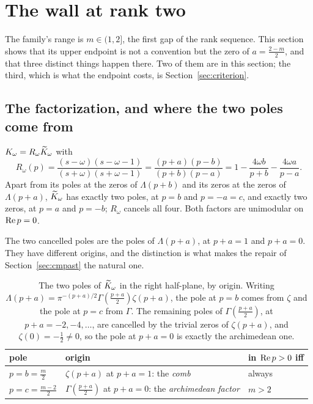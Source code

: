 \section{The wall at rank two}\label{sec:wall}

The family's range is $m\in(1,2]$, the first gap of the rank sequence. This
section shows that its upper endpoint is not a convention but the zero of
$a=\frac{2-m}2$, and that three distinct things happen there. Two of them are in
this section; the third, which is what the endpoint costs, is
Section~\ref{sec:criterion}.

\subsection{The factorization, and where the two poles come from}\label{sec:poles}

\begin{proposition}\label{prop:factor}
$K_\omega=R_\omega\widetilde K_\omega$ with
\begin{equation}\label{eq:factor}
 R_\omega(p)=\frac{(s-\omega)(s-\omega-1)}{(s+\omega)(s+\omega-1)}
 =\frac{(p+a)(p-b)}{(p+b)(p-a)}
 =1-\frac{4\omega b}{p+b}-\frac{4\omega a}{p-a} .
\end{equation}
Apart from its poles at the zeros of $\Lambda(p+b)$ and its zeros at the zeros of
$\Lambda(p+a)$, $\widetilde K_\omega$ has exactly two poles, at $p=b$ and $p=-a=c$, and
exactly two zeros, at $p=a$ and $p=-b$; $R_\omega$ cancels all four. Both factors
are unimodular on $\operatorname{Re} p=0$.
\end{proposition}

The two cancelled poles are the poles of $\Lambda(p+a)$, at $p+a=1$ and $p+a=0$.
They have different origins, and the distinction is what makes the repair of
Section~\ref{sec:cmpast} the natural one.

\begin{table}[ht]\centering\small
\caption{The two poles of $\widetilde K_\omega$ in the right half-plane, by origin.
Writing $\Lambda(p+a)=\pi^{-(p+a)/2}\Gamma(\frac{p+a}2)\zeta(p+a)$, the pole at
$p=b$ comes from $\zeta$ and the pole at $p=c$ from $\Gamma$. The remaining poles
of $\Gamma(\frac{p+a}2)$, at $p+a=-2,-4,\dots$, are cancelled by the trivial
zeros of $\zeta(p+a)$, and $\zeta(0)=-\frac12\ne0$, so the pole at $p+a=0$ is
exactly the archimedean one.}\label{tab:poles}
\begin{tabular}{@{}lll@{}}
\toprule
pole & origin & in $\operatorname{Re} p>0$ iff\\
\midrule
$p=b=\frac m2$ & $\zeta(p+a)$ at $p+a=1$: the \emph{comb} & always\\
$p=c=\frac{m-2}2$ & $\Gamma(\frac{p+a}2)$ at $p+a=0$: the \emph{archimedean factor} & $m>2$\\
\bottomrule
\end{tabular}
\end{table}

